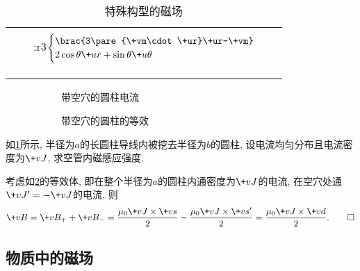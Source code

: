 \documentclass[hidelinks]{ctexart}
\begin{document}
\begin{longtable}[h]{|c|c|c|c|}
    &&&\\
    &&\+:r3{\+$\begin{cases}
        \brac{3\pare{\+vm\cdot\+ur}\+ur-\+vm}\\
        2\cos\theta\+ur+\sin\theta\+u\theta
    \end{cases}$\hspace{-1.5em}}&\\
    &&&\\
    &&&\\
    \hline
    \caption{特殊构型的磁场}
    \label{table:特殊构型的磁场}
\end{longtable}

\begin{figure}[ht]
    \centering
    \begin{subfigure}[b]{.45\textwidth}
        \centering
        \caption{带空穴的圆柱电流}
        \label{fig:带空穴的圆柱电流}
    \end{subfigure}
    \begin{subfigure}[b]{.45\textwidth}
        \centering
        \caption{带空穴的圆柱的等效}
        \label{fig:带空穴的圆柱的等效}
    \end{subfigure}
    \caption{}
    \label{fig:带空穴的圆柱电流例题}
\end{figure}

\begin{sample}
    \begin{ex}
        如\cref{fig:带空穴的圆柱电流}所示, 半径为$a$的长圆柱导线内被挖去半径为$b$的圆柱, 设电流均匀分布且电流密度为$\+vJ$, 求空管内磁感应强度.
    \end{ex}
    \begin{solution}
        考虑如\cref{fig:带空穴的圆柱的等效}的等效体, 即在整个半径为$a$的圆柱内通密度为$\+vJ$的电流, 在空穴处通$\+vJ'=-\+vJ$的电流, 则
        \[ \+vB = \+vB_+ + \+vB_- = \frac{\mu_0\+vJ\times\+vs}{2} - \frac{\mu_0\+vJ\times\+vs'}{2} = \frac{\mu_0\+vJ\times\+vd}{2}. \qedhere  \]
    \end{solution}
\end{sample}



\subsection{物质中的磁场} %
\label{sub:物质中的磁场}
\end{document}
